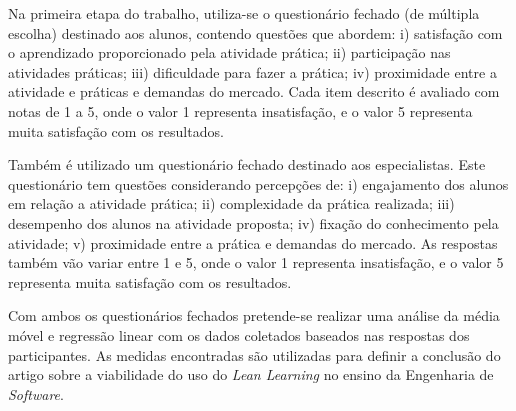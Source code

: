 Na primeira etapa do trabalho, utiliza-se o questionário fechado (de múltipla escolha) destinado aos alunos, contendo questões que abordem: i) satisfação com o aprendizado proporcionado pela atividade prática; ii) participação nas atividades práticas; iii) dificuldade para fazer a prática; iv) proximidade entre a atividade e práticas e demandas do mercado. Cada item descrito é avaliado com notas de 1 a 5, onde o valor 1 representa insatisfação, e o valor 5 representa muita satisfação com os resultados.

Também é utilizado um questionário fechado destinado aos especialistas. Este questionário tem questões considerando percepções de: i) engajamento dos alunos em relação a atividade prática; ii) complexidade da prática realizada; iii) desempenho dos alunos na atividade proposta; iv) fixação do conhecimento pela atividade; v) proximidade entre a prática e demandas do mercado. As respostas também vão variar entre 1 e 5, onde o valor 1 representa insatisfação, e o valor 5 representa muita satisfação com os resultados.

Com ambos os questionários fechados pretende-se realizar uma análise da média móvel e regressão linear com os dados coletados baseados nas respostas dos participantes. As medidas encontradas são utilizadas para definir a conclusão do artigo sobre a viabilidade do uso do \textit{Lean Learning} no ensino da Engenharia de \textit{Software}.
